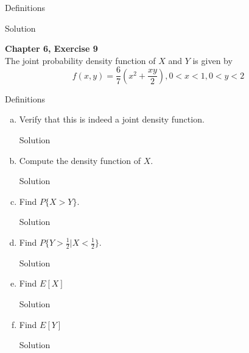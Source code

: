 \documentclass{article}
\begin{document}
\begin{spacing}{1.1}
\begin{homeworkProblem}
\begin{homeworkSection}{Definitions}
    
  \end{homeworkSection}
  \begin{homeworkSection}{Solution}
    
  \end{homeworkSection}
\end{homeworkProblem}

\newpage
\begin{homeworkProblem}
  {\bf Chapter 6, Exercise 9}\\
  The joint probability density function of $X$ and $Y$ is given by
  \[f( x, y) = \frac{ 6}{ 7} \left( x^2 + \frac{ x y}{ 2}\right), 
    0 < x < 1, 0 < y < 2\]

  \begin{homeworkSection}{Definitions}

  \end{homeworkSection}
  \begin{enumerate}[(a)]
    \item Verify that this is indeed a joint density function.
      \begin{homeworkSection}{Solution}

      \end{homeworkSection}
    \item Compute the density function of $X$.
      \begin{homeworkSection}{Solution}

      \end{homeworkSection}
    \item Find $P\{ X > Y\}$.
      \begin{homeworkSection}{Solution}

      \end{homeworkSection}
    \item Find $P\{ Y > \frac{ 1}{ 2}| X < \frac{ 1}{ 2}\}$.
      \begin{homeworkSection}{Solution}

      \end{homeworkSection}
    \item Find $E[ X]$
      \begin{homeworkSection}{Solution}

      \end{homeworkSection}
    \item Find $E[ Y]$
      \begin{homeworkSection}{Solution}

      \end{homeworkSection}
  \end{enumerate}
\end{homeworkProblem}


\end{spacing}
\end{document}
